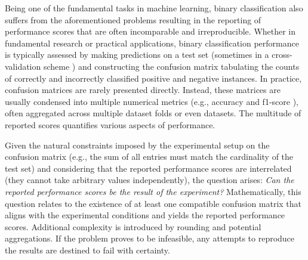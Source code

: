 \documentclass[5p, final]{elsarticle}
\begin{document}
Being one of the fundamental tasks in machine learning, binary classification \cite{mlbook} also suffers from the aforementioned problems resulting in the reporting of performance scores that are often incomparable and irreproducible. Whether in fundamental research or practical applications, binary classification performance is typically assessed by making predictions on a test set (sometimes in a cross-validation scheme \cite{cv1}) and constructing the confusion matrix \cite{scores} tabulating the counts of correctly and incorrectly classified positive and negative instances. In practice, confusion matrices are rarely presented directly. Instead, these matrices are usually condensed into multiple numerical metrics (e.g., accuracy and f1-score \cite{scores}), often aggregated across multiple dataset folds or even datasets. The multitude of reported scores quantifies various aspects of performance.

Given the natural constraints imposed by the experimental setup on the confusion matrix (e.g., the sum of all entries must match the cardinality of the test set) and considering that the reported performance scores are interrelated (they cannot take arbitrary values independently), the question arises: \emph{Can the reported performance scores be the result of the experiment?} Mathematically, this question relates to the existence of at least one compatible confusion matrix that aligns with the experimental conditions and yields the reported performance scores. Additional complexity is introduced by rounding and potential aggregations. If the problem proves to be infeasible, any attempts to reproduce the results are destined to fail with certainty. 
\end{document}
